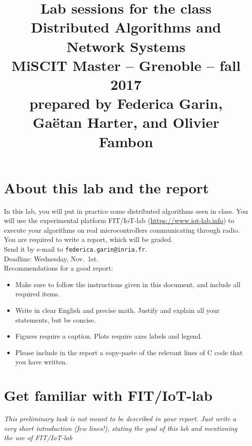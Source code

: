 \documentclass{article}
\begin{document}
\title{
{\normalsize Lab sessions for the class}\\[-1mm]
Distributed Algorithms and Network Systems\\[-1mm]
{\normalsize MiSCIT Master -- Grenoble -- fall 2017}\\[-1mm]
{\normalsize prepared by Federica Garin, Ga\"{e}tan Harter, and Olivier Fambon}}
\date{}
\maketitle



\section{About this lab and the report}
In this lab, you will put in practice some distributed algorithms seen in class.
You will use the experimental platform FIT/IoT-lab (\url{https://www.iot-lab.info})
to execute your algorithms on real microcontrollers communicating through radio.\\

You are required to write a report, which will be graded.\\ Send it by e-mail to \texttt{federica.garin@inria.fr}.\\
Deadline: Wednesday, Nov.~1st.\\

Recommendations for a good report:
\begin{itemize}
\item Make sure to follow the instructions given in this document, and include all required items.
\item Write in clear English and precise math. Justify and explain all your statements, but be concise.
\item Figures require a caption. Plots require axes labels and legend.
\item Please include in the report a copy-paste of the relevant lines of C code that you have written.
\end{itemize}

\newpage

\section{Get familiar with FIT/IoT-lab}


\textit{\color{blue} This preliminary task is not meant to be described in your report. Just write a very short introduction (few lines!), stating the goal of this lab and mentioning the use of FIT/IoT-lab}\\
\end{document}
